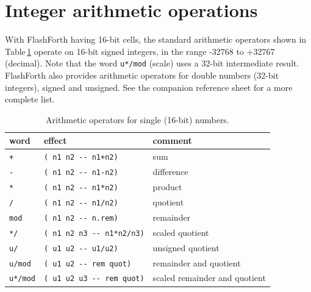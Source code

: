 \documentclass[12pt,a4paper]{article}
\begin{document}
\newpage
\section{Integer arithmetic operations}
\label{sec:arithmetic}
%
With FlashForth having 16-bit cells, the standard arithmetic operators 
shown in Table\,\ref{tab:arithmetic-operators}
operate on 16-bit signed integers, in the range -32768 to +32767 (decimal).
Note that the word \verb!u*/mod! (scale) uses a 32-bit intermediate result.
FlashForth also provides arithmetic operators 
for double numbers (32-bit integers), signed and unsigned.
See the companion reference sheet \cite{jacobs_2016b} for a more complete list.

\begin{table}[htb]
 \caption{Arithmetic operators for single (16-bit) numbers.}
 \label{tab:arithmetic-operators}
 \centering
 \begin{tabular}{lll}
  \hline
  word & effect & comment \\
  \hline
  \verb!+! & \verb!( n1 n2 -- n1+n2)! & sum \\
  \verb!-! & \verb!( n1 n2 -- n1-n2)! & difference \\
  \verb!*! & \verb!( n1 n2 -- n1*n2)! & product \\
  \verb!/! & \verb!( n1 n2 -- n1/n2)! & quotient \\
  \verb!mod! & \verb!( n1 n2 -- n.rem)! & remainder \\
  \verb!*/! & \verb!( n1 n2 n3 -- n1*n2/n3)! & scaled quotient \\
  \verb!u/! & \verb!( u1 u2 -- u1/u2)! & unsigned quotient \\
  \verb!u/mod! & \verb!( u1 u2 -- rem quot)! & remainder and quotient \\
  \verb!u*/mod! & \verb!( u1 u2 u3 -- rem quot)! & scaled remainder and quotient \\
  \hline
 \end{tabular}
\end{table}
\end{document}
